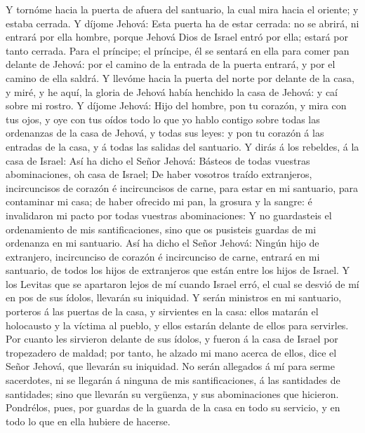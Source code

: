  Y tornóme hacia la puerta de afuera del santuario, la
cual mira hacia el oriente; y estaba cerrada.  Y díjome
Jehová: Esta puerta ha de estar cerrada: no se abrirá, ni entrará por
ella hombre, porque Jehová Dios de Israel entró por ella; estará por
tanto cerrada.  Para el príncipe; el príncipe, él se
sentará en ella para comer pan delante de Jehová: por el camino de la
entrada de la puerta entrará, y por el camino de ella saldrá.
 Y llevóme hacia la puerta del norte por delante de la
casa, y miré, y he aquí, la gloria de Jehová había henchido la casa de
Jehová: y caí sobre mi rostro.  Y díjome Jehová: Hijo del
hombre, pon tu corazón, y mira con tus ojos, y oye con tus oídos todo lo
que yo hablo contigo sobre todas las ordenanzas de la casa de Jehová, y
todas sus leyes: y pon tu corazón á las entradas de la casa, y á todas
las salidas del santuario.  Y dirás á los rebeldes, á la
casa de Israel: Así ha dicho el Señor Jehová: Básteos de todas vuestras
abominaciones, oh casa de Israel;  De haber vosotros
traído extranjeros, incircuncisos de corazón é incircuncisos de carne,
para estar en mi santuario, para contaminar mi casa; de haber ofrecido
mi pan, la grosura y la sangre: é invalidaron mi pacto por todas
vuestras abominaciones:  Y no guardasteis el ordenamiento
de mis santificaciones, sino que os pusisteis guardas de mi ordenanza en
mi santuario.  Así ha dicho el Señor Jehová: Ningún hijo
de extranjero, incircunciso de corazón é incircunciso de carne, entrará
en mi santuario, de todos los hijos de extranjeros que están entre los
hijos de Israel.  Y los Levitas que se apartaron lejos de
mí cuando Israel erró, el cual se desvió de mí en pos de sus ídolos,
llevarán su iniquidad.  Y serán ministros en mi
santuario, porteros á las puertas de la casa, y sirvientes en la casa:
ellos matarán el holocausto y la víctima al pueblo, y ellos estarán
delante de ellos para servirles.  Por cuanto les
sirvieron delante de sus ídolos, y fueron á la casa de Israel por
tropezadero de maldad; por tanto, he alzado mi mano acerca de ellos,
dice el Señor Jehová, que llevarán su iniquidad.  No
serán allegados á mí para serme sacerdotes, ni se llegarán á ninguna de
mis santificaciones, á las santidades de santidades; sino que llevarán
su vergüenza, y sus abominaciones que hicieron. 
Pondrélos, pues, por guardas de la guarda de la casa en todo su
servicio, y en todo lo que en ella hubiere de hacerse. 
